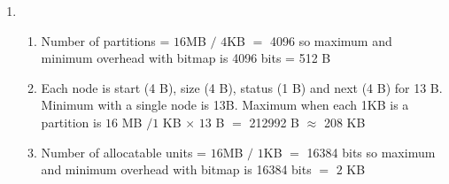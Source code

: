 \documentclass[12pt, a4paper]{article}
\begin{document}
\begin{enumerate}[Q\arabic*.]
  \item 
    \begin{enumerate}[(\alph*.)]
      \item Number of partitions = $16$MB $/$ $4$KB $=$ 4096 so maximum and minimum overhead with bitmap is 4096 bits = 512 B

      \item Each node is start (4 B), size (4 B), status (1 B) and next (4 B) for 13 B.\\
        Minimum with a single node is 13B. Maximum when each 1KB is a partition is $16$ MB $/ 1$ KB $\times$ $13$ B $=$ 212992 B $\approx$ 208 KB

      \item Number of allocatable units = $16$MB $/$ $1$KB $=$ 16384 bits so maximum and minimum overhead with bitmap is 16384 bits $=$ $2$ KB

    \end{enumerate}

\end{enumerate}
\end{document}
